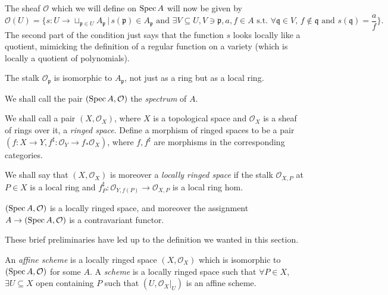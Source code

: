 \documentclass[000-main.tex]{subfiles}
\begin{document}
The sheaf $\mathcal{O}$ which we will define on $\operatorname{Spec} A$ will now be given by 
\[
\mathcal{O}(U) = \lbrace s : U \to \sqcup_{\mathfrak{p} \in U} A_{\mathfrak{p}} \, | \, s(\mathfrak{p}) \in A_{\mathfrak{p}} \text{ and } \exists V \subseteq U, V \ni \mathfrak{p}, a, f \in A \text{ s.t. } \forall \mathfrak{q} \in V, \, f \notin \mathfrak{q} \text{ and } s(\mathfrak{q}) = \frac{a}{f} \rbrace.  
\]
The second part of the condition just says that the function $s$ looks locally like a quotient, mimicking the definition of a regular function on a variety (which is locally a quotient of polynomials). 

\begin{lemma}
	The stalk $\mathcal{O}_{\mathfrak{p}}$ is isomorphic to $A_{\mathfrak{p}}$, not just as a ring but as a local ring. 
\end{lemma}

We shall call the pair $(\operatorname{Spec} A, \mathcal{O})$ the \emph{spectrum} of $A$. 

\begin{definition}
	We shall call a pair $(X, \mathcal{O}_X)$, where $X$ is a topological space and $\mathcal{O}_X$ is a sheaf of rings over it, a \emph{ringed space}. Define a morphism of ringed spaces to be a pair $(f : X \to Y, f^\sharp : \mathcal{O}_Y \to f_\ast \mathcal{O}_X)$, where $f, f^\sharp$ are morphisms in the corresponding categories. 
	
	We shall say that $(X, \mathcal{O}_X)$ is moreover a \emph{locally ringed space} if the stalk $\mathcal{O}_{X, P}$ at $P \in X$ is a local ring and $f^\sharp_P : \mathcal{O}_{Y, f(P)} \to \mathcal{O}_{X, P}$ is a local ring hom. 
\end{definition}

\begin{example}
	$(\operatorname{Spec} A, \mathcal{O})$ is a locally ringed space, and moreover the assignment $A \to (\operatorname{Spec} A , \mathcal{O})$ is a contravariant functor. 
\end{example}

These brief preliminaries have led up to the definition we wanted in this section. 

\begin{definition}
	An \emph{affine scheme} is a locally ringed space $(X, \mathcal{O}_X)$ which is isomorphic to $(\operatorname{Spec} A, \mathcal{O})$ for some $A$. A \emph{scheme} is a locally ringed space such that $\forall P \in X$, $\exists U \subseteq X$ open containing $P$ such that $(U, \left . \mathcal{O}_X \right \rvert_{U})$ is an affine scheme. 
\end{definition}
\end{document}
